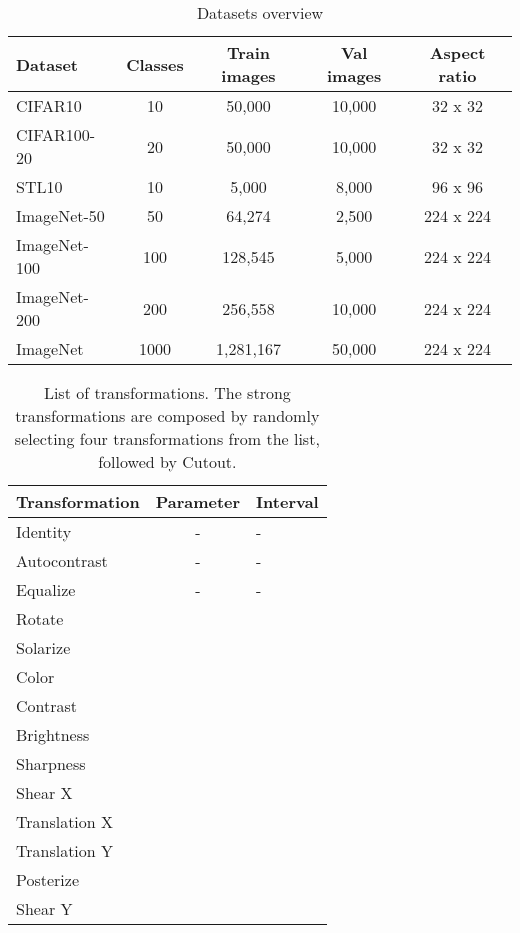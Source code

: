\documentclass[runningheads]{llncs}
\begin{document}
\setlength{\tabcolsep}{4pt}
\begin{table}[ht!]
\scriptsize
\begin{center}
\caption{Datasets overview}
\label{tab: datasets}
\begin{tabular}{@{}l cccc @{}}
\toprule
\textbf{Dataset} & \textbf{Classes} & \textbf{Train images} & \textbf{Val images} & \textbf{Aspect ratio}\\ 
\midrule
CIFAR10 & 10 & 50,000 & 10,000 & 32 x 32\\
CIFAR100-20 & 20 & 50,000 & 10,000 & 32 x 32\\
STL10 & 10 & 5,000 & 8,000 & 96 x 96\\
ImageNet-50 & 50 & 64,274 & 2,500 & 224 x 224\\
ImageNet-100 & 100 & 128,545 & 5,000 & 224 x 224\\
ImageNet-200 & 200 & 256,558 & 10,000 & 224 x 224\\
ImageNet & 1000 & 1,281,167 & 50,000 & 224 x 224\\
\bottomrule
\end{tabular}
\end{center}
\end{table}
\setlength{\tabcolsep}{4pt}
\begin{table}[ht]
\scriptsize
\begin{center}
\caption{List of transformations. The strong transformations are composed by randomly selecting four transformations from the list, followed by Cutout.}
\label{tab: rand_augment}
\begin{tabular}{@{}l cl @{}}
\toprule
\textbf{Transformation} & \textbf{Parameter} & \textbf{Interval}\\ 
\midrule
Identity & - & - \\
Autocontrast & - & - \\
Equalize & - & - \\
Rotate &  &  \\
Solarize &  &  \\
Color &  &  \\
Contrast &  &  \\
Brightness &  &  \\
Sharpness &  &  \\
Shear X &  &  \\
Translation X &  &  \\
Translation Y &  &  \\
Posterize &  &  \\
Shear Y &  &  \\
\bottomrule
\end{tabular}
\end{center}
\end{table}
\setlength{\tabcolsep}{4pt}
\end{document}
